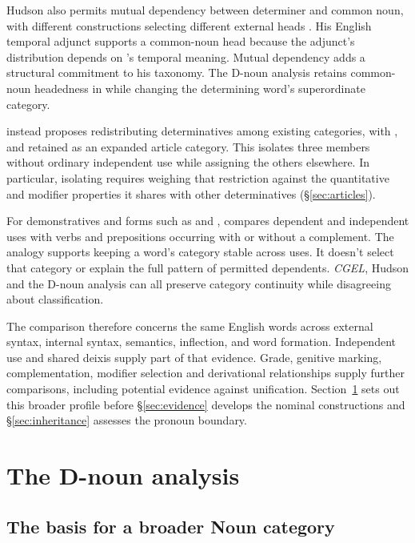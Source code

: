 \documentclass[12pt]{article}
\begin{document}
Hudson also permits mutual dependency between determiner and common noun, with different constructions selecting different external heads \citep[7--12]{hudson2004determiners}. His English temporal adjunct  supports a common-noun head because the adjunct's distribution depends on 's temporal meaning. Mutual dependency adds a structural commitment to his taxonomy. The D-noun analysis retains common-noun headedness in  while changing the determining word's superordinate category.

\textcite{spinillo2004reconceptualising} instead proposes redistributing determinatives among existing categories, with ,  and  retained as an expanded article category. This isolates three members without ordinary independent use while assigning the others elsewhere. In particular, isolating  requires weighing that restriction against the quantitative and modifier properties it shares with other determinatives (§\ref{sec:articles}).

For demonstratives and forms such as  and , \textcite[140--144]{spinillo2004reconceptualising} compares dependent and independent uses with verbs and prepositions occurring with or without a complement. The analogy supports keeping a word's category stable across uses. It doesn't select that category or explain the full pattern of permitted dependents. \textit{CGEL}, Hudson and the D-noun analysis can all preserve category continuity while disagreeing about classification.

The comparison therefore concerns the same English words across external syntax, internal syntax, semantics, inflection, and word formation. Independent use and shared deixis supply part of that evidence. Grade, genitive marking, complementation, modifier selection and derivational relationships supply further comparisons, including potential evidence against unification. Section~\ref{sec:proposal} sets out this broader profile before §\ref{sec:evidence} develops the nominal constructions and §\ref{sec:inheritance} assesses the pronoun boundary.

\section{The D-noun analysis}\label{sec:proposal}

\subsection{The basis for a broader Noun category}\label{sec:membership}
\end{document}
